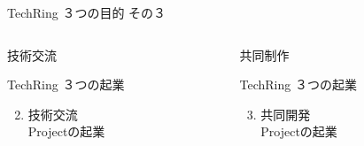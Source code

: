 \documentclass[dvipdfmx]{beamer}
\begin{document}
\begin{frame}{TechRing ３つの目的 その３}
\begin{columns}
    \begin{column}{0.30\textwidth}
      \begin{block}{技術交流}
        \begin{footnotesize}
          TechRing ３つの起業
          \begin{enumerate}
            \setcounter{enumi}{1}
            \item 技術交流\\Projectの起業
          \end{enumerate}
        \end{footnotesize}
      \end{block}
    \end{column}

    \begin{column}{0.30\textwidth}
      \begin{alertblock}{共同制作}
        \begin{footnotesize}
          TechRing ３つの起業 \par
          \begin{enumerate}
            \setcounter{enumi}{2}
            \item 共同開発\\Projectの起業
          \end{enumerate}
        \end{footnotesize}
      \end{alertblock}
    \end{column}
  \end{columns}
\end{frame}
\end{document}
